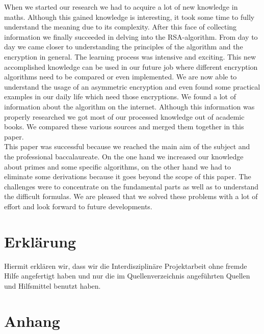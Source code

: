 When we started our research we had to acquire a lot of new knowledge in maths. Although this gained knowledge is interesting, it took some time to fully understand the meaning due to its complexity. After this face of collecting information we finally succeeded in delving into the RSA-algorithm. %
From day to day we came closer to understanding the principles of the algorithm and the encryption in general. The learning process was intensive and exciting. This new accomplished knowledge can be used in our future job where different encryption algorithms need to be compared or even implemented. We are now able to understand the usage of an asymmetric encryption and even found some practical examples in our daily life which need those encryptions.  
We found a lot of information about the algorithm on the internet. Although this information was properly researched we got most of our processed knowledge out of academic books. We compared these various sources and merged them together in this paper.\\
This paper was successful because we reached the main aim of the subject and the professional baccalaureate. On the one hand we increased our knowledge about primes and some specific algorithms, on the other hand we had to eliminate some derivations  %
because it goes beyond the scope of this paper. The challenges were to concentrate on the fundamental parts as well as to understand the difficult formulas. We are pleased that we solved these problems with a lot of effort and look forward to future developments. 
\newpage
\section{Erklärung}
Hiermit erklären wir, dass wir die Interdisziplinäre Projektarbeit ohne fremde Hilfe angefertigt haben und nur die im Quellenverzeichnis angeführten Quellen und Hilfsmittel benutzt haben.
\newpage
\section{Anhang}
\listoffigures
\listoftables
%

